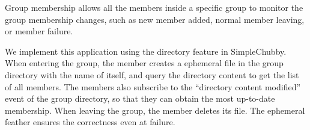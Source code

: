 Group membership allows all the members inside a specific group to monitor
the group membership changes, such as new member added, normal member leaving,
or member failure.

We implement this application using the directory feature in SimpleChubby.
When entering the group, the member creates a ephemeral file in the group
directory with the name of itself, and query the directory content to get
the list of all members. The members also subscribe to the ``directory content
modified'' event of the group directory, so that they can obtain the most
up-to-date membership. When leaving the group, the member deletes its file.
The ephemeral feather ensures the correctness even at failure.



